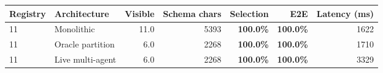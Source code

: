 \begin{tabular}{llrrrrr}
\toprule
Registry & Architecture & Visible & Schema chars & Selection & E2E & Latency (ms) \\
\midrule
11 & Monolithic & 11.0 & 5393 & \textbf{100.0\%} & \textbf{100.0\%} & 1622 \\
11 & Oracle partition & 6.0 & 2268 & \textbf{100.0\%} & \textbf{100.0\%} & 1710 \\
11 & Live multi-agent & 6.0 & 2268 & \textbf{100.0\%} & \textbf{100.0\%} & 3329 \\
\bottomrule
\end{tabular}
